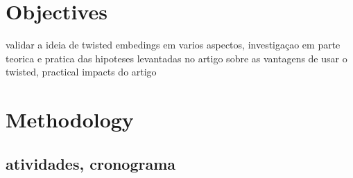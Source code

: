 \documentclass[Ingles]{ic-tese-v3}
\begin{document}
\chapter{Objectives}
\label{sec:org6b78ef3}
validar a ideia de twisted embedings em varios aspectos, investigaçao em parte teorica e pratica das hipoteses levantadas no artigo sobre as vantagens de usar o twisted, practical impacts do artigo
\chapter{Methodology}
\label{sec:orge88ddc3}
\section{atividades, cronograma}
\label{sec:org9125674}


\end{document}
